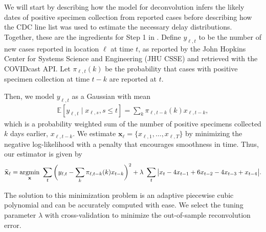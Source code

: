 \begin{linenomath*} 
We will start by describing how the model for deconvolution infers the likely
dates of positive specimen collection from reported cases before describing how
the CDC line list \citep{cdc2020caserestr} 
was used to estimate the necessary delay distributions. Together,
these are the ingredients for Step 1 in .
Define $y_{\ell,t}$ to be the number of new cases reported in location $\ell$ at
time $t$, as reported by the John Hopkins Center for Systems Science and
Engineering (JHU CSSE)\citealp{dong2020interactive} and retrieved with the
COVIDcast API. \citep{reinhart2021open} Let $\pi_{\ell,t}(k)$ be the probability
that cases with positive specimen collection at time $t-k$ are reported at $t$. 
\end{linenomath*} 
\begin{linenomath*} 
Then, we
model $y_{\ell,t}$ as a Gaussian with mean 
\begin{align}
  \mathbb{E}[y_{\ell,t} \mid x_{\ell,s}, s \leq t ] =\sum_{k} \pi_{\ell,t-k}(k)x_{\ell,t-k},
  \label{eq:cases-model}
\end{align}
which is a probability weighted sum of the number of positive specimens
collected $k$ days earlier, $x_{\ell,t-k}$.
We estimate $\mathbf{x}_\ell = \{x_{\ell,1},\ldots,x_{\ell,T}\}$ by minimizing
the negative log-likelihood with a penalty that encourages smoothness in time.
Thus, our estimator is given by
\begin{align}
  \widehat{\mathbf{x}}_\ell = \operatorname*{argmin}_{\mathbf{x}}\ \sum_{t}
  \bigg( y_{\ell,t} -  \sum_k \pi_{\ell,t-k}(k) x_{t-k} \bigg)^2 
  + \lambda\ \sum_t \big|x_t - 4x_{t-1} + 6x_{t-2} -4x_{t-3}+ x_{t-4}\big|.
  \label{eq:cases-deconvolved}
\end{align}
\end{linenomath*} 
The solution to this minimization
problem is an adaptive piecewise cubic polynomial \citep{tibshirani2014adaptive,
tibshirani2022divided} and can be accurately computed with ease.
\citep{ramdas2016fast,jahja2022real} We select the tuning parameter
$\lambda$ with cross-validation
to minimize the out-of-sample reconvolution error. 

